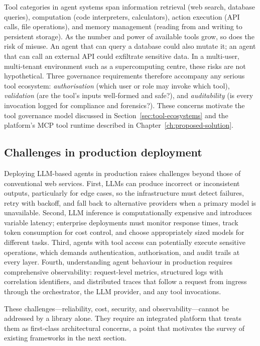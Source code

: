 \documentclass[a4paper]{sapthesis}
\begin{document}
Tool categories in agent systems span information retrieval (web search,
database queries), computation (code interpreters, calculators), action
execution (API calls, file operations), and memory management (reading
from and writing to persistent storage).  As the number and power of
available tools grow, so does the risk of misuse.  An agent that can query
a database could also mutate it; an agent that can call an external API
could exfiltrate sensitive data.  In a multi-user, multi-tenant environment
such as a supercomputing centre, these risks are not hypothetical.  Three
governance requirements therefore accompany any serious tool ecosystem:
\emph{authorisation} (which user or role may invoke which tool),
\emph{validation} (are the tool's inputs well-formed and safe?), and
\emph{auditability} (is every invocation logged for compliance and
forensics?).  These concerns motivate the tool governance model discussed
in Section~\ref{sec:tool-ecosystems} and the platform's MCP tool runtime
described in Chapter~\ref{ch:proposed-solution}.

\subsection{Challenges in production deployment}

Deploying LLM-based agents in production raises challenges beyond those of
conventional web services.  First, LLMs can produce incorrect or
inconsistent outputs, particularly for edge cases, so the infrastructure
must detect failures, retry with backoff, and fall back to alternative
providers when a primary model is unavailable.  Second, LLM inference is
computationally expensive and introduces variable latency; enterprise
deployments must monitor response times, track token consumption for cost
control, and choose appropriately sized models for different tasks.  Third,
agents with tool access can potentially execute sensitive operations, which
demands authentication, authorisation, and audit trails at every layer.
Fourth, understanding agent behaviour in production requires comprehensive
observability: request-level metrics, structured logs with correlation
identifiers, and distributed traces that follow a request from ingress
through the orchestrator, the LLM provider, and any tool invocations.

These challenges---reliability, cost, security, and
observability---cannot be addressed by a library alone.  They require an
integrated platform that treats them as first-class architectural concerns,
a point that motivates the survey of existing frameworks in the next
section.
\end{document}
